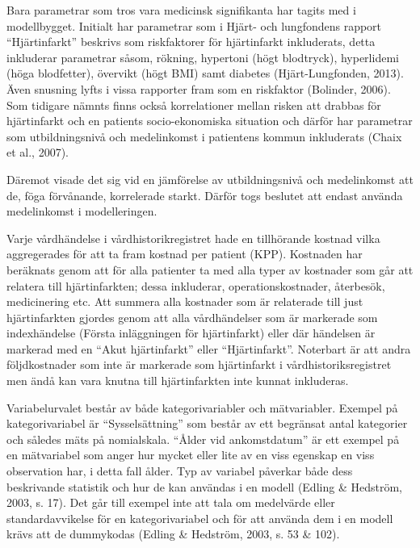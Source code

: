Bara parametrar som tros vara medicinsk signifikanta har tagits med i modellbygget. Initialt har parametrar som i Hjärt- och lungfondens rapport “Hjärtinfarkt” beskrivs som riskfaktorer för hjärtinfarkt inkluderats, detta inkluderar parametrar såsom, rökning, hypertoni (högt blodtryck), hyperlidemi (höga blodfetter), övervikt (högt BMI) samt diabetes (Hjärt-Lungfonden, 2013). Även snusning lyfts i vissa rapporter fram som en riskfaktor (Bolinder, 2006). Som tidigare nämnts finns också korrelationer mellan risken att drabbas för hjärtinfarkt och en patients socio-ekonomiska situation och därför har parametrar som utbildningsnivå och medelinkomst i patientens kommun inkluderats (Chaix et al., 2007).

Däremot visade det sig vid en jämförelse av utbildningsnivå och medelinkomst att de, föga förvånande, korrelerade starkt. Därför togs beslutet att endast använda medelinkomst i modelleringen.

Varje vårdhändelse i vårdhistorikregistret hade en tillhörande kostnad vilka aggregerades för att ta fram kostnad per patient (KPP). Kostnaden har beräknats genom att för alla patienter ta med alla typer av kostnader som går att relatera till hjärtinfarkten; dessa inkluderar, operationskostnader, återbesök, medicinering etc. Att summera alla kostnader som är relaterade till just hjärtinfarkten gjordes genom att alla vårdhändelser som är markerade som indexhändelse (Första inläggningen för hjärtinfarkt) eller där händelsen är markerad med en “Akut hjärtinfarkt” eller “Hjärtinfarkt”. Noterbart är att andra följdkostnader som inte är markerade som hjärtinfarkt i vårdhistoriksregistret men ändå kan vara knutna till hjärtinfarkten inte kunnat inkluderas.


Variabelurvalet består av både kategorivariabler och mätvariabler. Exempel på
kategorivariabel är “Sysselsättning” som består av ett begränsat antal
kategorier och således mäts på nomialskala. “Ålder vid ankomstdatum” är ett
exempel på en mätvariabel som anger hur mycket eller lite av en viss egenskap en
viss observation har, i detta fall ålder. Typ av variabel påverkar både dess
beskrivande statistik och hur de kan användas i en modell (Edling \& Hedström,
2003, s. 17). Det går till exempel inte att tala om medelvärde eller
standardavvikelse för en kategorivariabel och för att använda dem i en modell krävs att de dummykodas (Edling \& Hedström, 2003, s. 53 \& 102).

